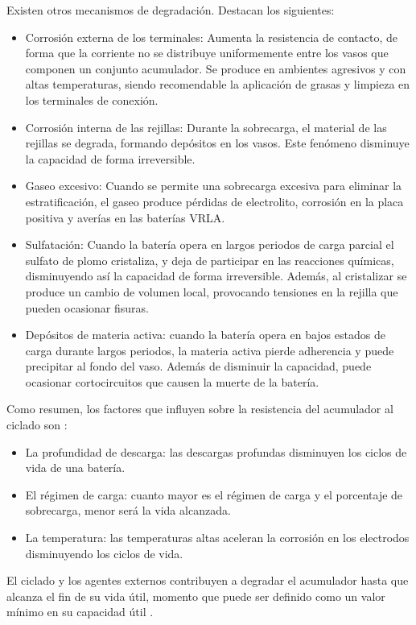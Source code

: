 Existen otros mecanismos de degradación. Destacan los siguientes:
\begin{itemize}
\item Corrosión\textbf{\emph{ }}externa\textbf{ }de los terminales: Aumenta
la resistencia de contacto, de forma que la corriente no se distribuye
uniformemente entre los vasos que componen un conjunto acumulador.
Se produce en ambientes agresivos y con altas temperaturas, siendo
recomendable la aplicación de grasas y limpieza en los terminales
de conexión.
\item Corrosión interna de las rejillas: Durante la sobrecarga, el material
de las rejillas se degrada, formando depósitos en los vasos. Este
fenómeno disminuye la capacidad de forma irreversible.
\item Gaseo excesivo: Cuando se permite una sobrecarga excesiva para eliminar
la estratificación, el gaseo produce pérdidas de electrolito, corrosión
en la placa positiva y averías en las baterías VRLA.
\item Sulfatación: Cuando la batería opera en largos periodos de carga parcial
el sulfato de plomo cristaliza, y deja de participar en las reacciones
químicas, disminuyendo así la capacidad de forma irreversible. Además,
al cristalizar se produce un cambio de volumen local, provocando tensiones
en la rejilla que pueden ocasionar fisuras.
\item Depósitos de materia activa: cuando la batería opera en bajos estados
de carga durante largos periodos, la materia activa pierde adherencia
y puede precipitar al fondo del vaso. Además de disminuir la capacidad,
puede ocasionar cortocircuitos que causen la muerte de la batería.
\end{itemize}
Como resumen, los factores que influyen sobre la resistencia del acumulador
al ciclado son \cite{Fullea1994}:
\needspace{3\onelineskip}
\begin{itemize}
\item La profundidad de descarga: las descargas profundas disminuyen los
ciclos de vida de una batería.
\item El régimen de carga: cuanto mayor es el régimen de carga y el porcentaje
de sobrecarga, menor será la vida alcanzada.
\item La temperatura: las temperaturas altas aceleran la corrosión en los
electrodos disminuyendo los ciclos de vida.
\end{itemize}
El ciclado y los agentes externos contribuyen a degradar el acumulador
hasta que alcanza el fin de su vida útil, momento que puede ser definido
como un valor mínimo en su capacidad útil \cite{Egido.Lorenzo1998}.



